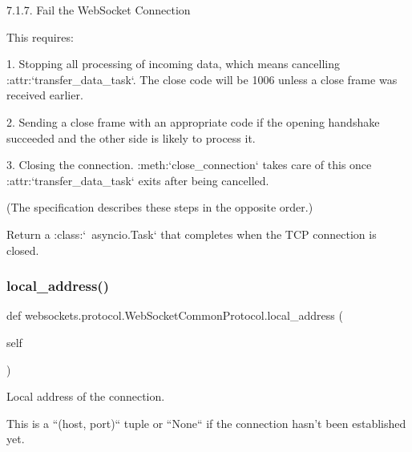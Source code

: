 \begin{DoxyVerb}7.1.7. Fail the WebSocket Connection

This requires:

1. Stopping all processing of incoming data, which means cancelling
   :attr:`transfer_data_task`. The close code will be 1006 unless a
   close frame was received earlier.

2. Sending a close frame with an appropriate code if the opening
   handshake succeeded and the other side is likely to process it.

3. Closing the connection. :meth:`close_connection` takes care of
   this once :attr:`transfer_data_task` exits after being cancelled.

(The specification describes these steps in the opposite order.)

Return a :class:`~asyncio.Task` that completes when the TCP connection
is closed.\end{DoxyVerb}
 \mbox{\label{classwebsockets_1_1protocol_1_1_web_socket_common_protocol_a147f81a594cc1d7f952a90800283ff2d}} 
\subsubsection{\texorpdfstring{local\+\_\+address()}{local\_address()}}
{\footnotesize\ttfamily def websockets.\+protocol.\+Web\+Socket\+Common\+Protocol.\+local\+\_\+address (\begin{DoxyParamCaption}\item[{}]{self }\end{DoxyParamCaption})}

\begin{DoxyVerb}Local address of the connection.

This is a ``(host, port)`` tuple or ``None`` if the connection hasn't
been established yet.\end{DoxyVerb}
 \mbox{\label{classwebsockets_1_1protocol_1_1_web_socket_common_protocol_ac646626706d4fea1e2ac92c056d1b572}} 
